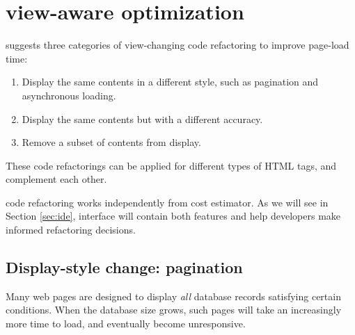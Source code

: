 \section{\ToolP view-aware optimization}
\label{sec:opt}


\Tool suggests three categories of view-changing code refactoring
to improve page-load time:

\begin{enumerate}
    \item Display the same contents in a different style, such as pagination and asynchronous loading.
    \item Display the same contents but with a different accuracy.
    \item Remove a subset of contents from display.
\end{enumerate}

These code refactorings can be applied for different types of HTML tags, and complement each other. 

\ToolP code refactoring works independently from \ToolP cost estimator. As we will see in Section \ref{sec:ide}, \ToolP interface will contain both features and help developers make informed refactoring decisions.



\subsection{Display-style change: pagination}
\label{sec:pagi}

Many web pages are designed to display {\it all} database records satisfying
certain conditions. When the database size grows, such pages will take an increasingly 
more time to load, and eventually become unresponsive.

